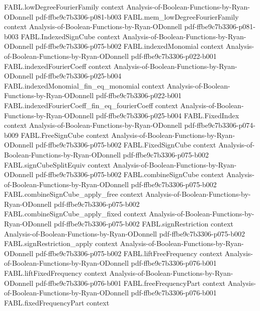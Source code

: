\begin{theorem}
  {FABL.lowDegreeFourierFamily}
  {context}
  {Analysis-of-Boolean-Functions-by-Ryan-ODonnell}
  {pdf-ffbe9c7b3306-p081-b003}
\proofstep
  {FABL.mem_lowDegreeFourierFamily}
  {context}
  {Analysis-of-Boolean-Functions-by-Ryan-ODonnell}
  {pdf-ffbe9c7b3306-p081-b003}
\proofstep
  {FABL.IndexedSignCube}
  {context}
  {Analysis-of-Boolean-Functions-by-Ryan-ODonnell}
  {pdf-ffbe9c7b3306-p075-b002}
\proofstep
  {FABL.indexedMonomial}
  {context}
  {Analysis-of-Boolean-Functions-by-Ryan-ODonnell}
  {pdf-ffbe9c7b3306-p022-b001}
\proofstep
  {FABL.indexedFourierCoeff}
  {context}
  {Analysis-of-Boolean-Functions-by-Ryan-ODonnell}
  {pdf-ffbe9c7b3306-p025-b004}
\proofstep
  {FABL.indexedMonomial_fin_eq_monomial}
  {context}
  {Analysis-of-Boolean-Functions-by-Ryan-ODonnell}
  {pdf-ffbe9c7b3306-p022-b001}
\proofstep
  {FABL.indexedFourierCoeff_fin_eq_fourierCoeff}
  {context}
  {Analysis-of-Boolean-Functions-by-Ryan-ODonnell}
  {pdf-ffbe9c7b3306-p025-b004}
\proofstep
  {FABL.FixedIndex}
  {context}
  {Analysis-of-Boolean-Functions-by-Ryan-ODonnell}
  {pdf-ffbe9c7b3306-p074-b009}
\proofstep
  {FABL.FreeSignCube}
  {context}
  {Analysis-of-Boolean-Functions-by-Ryan-ODonnell}
  {pdf-ffbe9c7b3306-p075-b002}
\proofstep
  {FABL.FixedSignCube}
  {context}
  {Analysis-of-Boolean-Functions-by-Ryan-ODonnell}
  {pdf-ffbe9c7b3306-p075-b002}
\proofstep
  {FABL.signCubeSplitEquiv}
  {context}
  {Analysis-of-Boolean-Functions-by-Ryan-ODonnell}
  {pdf-ffbe9c7b3306-p075-b002}
\proofstep
  {FABL.combineSignCube}
  {context}
  {Analysis-of-Boolean-Functions-by-Ryan-ODonnell}
  {pdf-ffbe9c7b3306-p075-b002}
\proofstep
  {FABL.combineSignCube_apply_free}
  {context}
  {Analysis-of-Boolean-Functions-by-Ryan-ODonnell}
  {pdf-ffbe9c7b3306-p075-b002}
\proofstep
  {FABL.combineSignCube_apply_fixed}
  {context}
  {Analysis-of-Boolean-Functions-by-Ryan-ODonnell}
  {pdf-ffbe9c7b3306-p075-b002}
\proofstep
  {FABL.signRestriction}
  {context}
  {Analysis-of-Boolean-Functions-by-Ryan-ODonnell}
  {pdf-ffbe9c7b3306-p075-b002}
\proofstep
  {FABL.signRestriction_apply}
  {context}
  {Analysis-of-Boolean-Functions-by-Ryan-ODonnell}
  {pdf-ffbe9c7b3306-p075-b002}
\proofstep
  {FABL.liftFreeFrequency}
  {context}
  {Analysis-of-Boolean-Functions-by-Ryan-ODonnell}
  {pdf-ffbe9c7b3306-p076-b001}
\proofstep
  {FABL.liftFixedFrequency}
  {context}
  {Analysis-of-Boolean-Functions-by-Ryan-ODonnell}
  {pdf-ffbe9c7b3306-p076-b001}
\proofstep
  {FABL.freeFrequencyPart}
  {context}
  {Analysis-of-Boolean-Functions-by-Ryan-ODonnell}
  {pdf-ffbe9c7b3306-p076-b001}
\proofstep
  {FABL.fixedFrequencyPart}
  {context}

\end{theorem}
